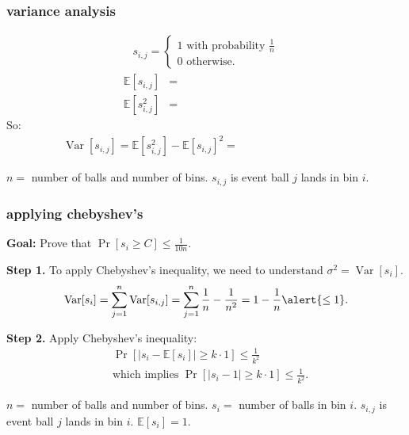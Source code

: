 \documentclass[handout,compress]{beamer}
\newcommand{\E}{\mathbb{E}}
\DeclareMathOperator{\Var}{Var}
\begin{document}
\begin{frame}
	\frametitle{variance analysis}

	\begin{align*}
		s_{i,j} = \begin{cases}
			1 \text{ with probability } \frac{1}{n}\\
			0 \text{ otherwise}.
		\end{cases}
	\end{align*}
	\begin{align*}
		\E[s_{i,j}] &= \hspace{10em}\\
		\E[s_{i,j}^2] &=  \hspace{10em}
	\end{align*}
	So:
	\begin{align*}
		\Var[s_{i,j}] = \E[s_{i,j}^2] - \E[s_{i,j}]^2 =  \hspace{10em}
	\end{align*}
	
	\vspace{0em}
	\begin{block}{\vspace*{-3ex}}
		\small $n = $ number of balls and number of bins. $s_{i,j}$ is event ball $j$ lands in bin $i$.
	\end{block}
\end{frame}

\begin{frame}
	\frametitle{applying chebyshev's}
	\textbf{Goal:} Prove that $\Pr[s_i \geq C] \leq \frac{1}{10n}$. 
	
	\textbf{Step 1.} To apply Chebyshev's inequality, we need to understand $\sigma^2 = \Var[s_i]$. 
	\begin{align*}
		\Var[s_i] = \sum_{j=1}^n \Var[s_{i,j}] = \sum_{j=1}^n \frac{1}{n} - \frac{1}{n^2} = {1- \frac{1}{n} \alert{\leq 1}.}
	\end{align*}
	
	\textbf{Step 2.} Apply Chebyshev's inequality:
	\begin{align*}
		&\Pr\left[\left|s_i - \E[s_i]\right| \geq k\cdot 1\right] \leq \frac{1}{k^2} \\
		&\text{which implies }\Pr\left[\left|s_i - 1\right| \geq k\cdot 1\right] \leq \frac{1}{k^2}.
	\end{align*}
	
	\vspace{0em}
	\begin{block}{\vspace*{-3ex}}
		\small $n = $ number of balls and number of bins. $s_i=$ number of balls in bin $i$.  $s_{i,j}$ is event ball $j$ lands in bin $i$. $\E[s_i] = 1$. 
	\end{block}
\end{frame}
\end{document}
